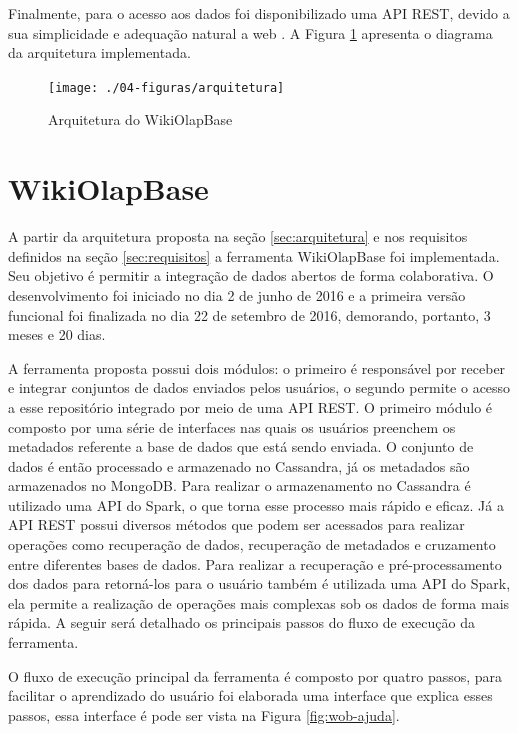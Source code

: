 Finalmente, para o acesso aos dados foi disponibilizado uma API REST, devido a sua 
simplicidade e adequação natural a web \cite{maleshkova2010}. A Figura \ref{fig:arquitetura} apresenta o 
diagrama da arquitetura implementada.  

\begin{figure}[!htb]
    \centering
    \caption{Arquitetura do WikiOlapBase}
    \texttt{[image: ./04-figuras/arquitetura]}
    \label{fig:arquitetura}
\end{figure}

\section{WikiOlapBase}
\label{sec:wob}

A partir da arquitetura proposta na seção \ref{sec:arquitetura} e nos requisitos definidos
na seção \ref{sec:requisitos} a ferramenta WikiOlapBase foi implementada. Seu objetivo é
permitir a integração de dados abertos de forma colaborativa. O desenvolvimento foi iniciado
no dia 2 de junho de 2016 e a primeira versão funcional foi finalizada no dia 22 de setembro
de 2016, demorando, portanto, 3 meses e 20 dias.

A ferramenta proposta possui dois módulos: o primeiro é responsável por receber e integrar
conjuntos de dados enviados pelos usuários, o segundo permite o acesso a esse repositório
integrado por meio de uma API REST. O primeiro módulo é composto por uma série de interfaces
nas quais os usuários preenchem os metadados referente a base de dados que está
sendo enviada. O conjunto de dados é então processado e armazenado no Cassandra, já os
metadados são armazenados no MongoDB. Para realizar o armazenamento no Cassandra é utilizado
uma API do Spark, o que torna esse processo mais rápido e eficaz. Já a API REST possui diversos
métodos que podem ser acessados para realizar operações como recuperação de dados, recuperação
de metadados e cruzamento entre diferentes bases de dados. Para realizar a recuperação e 
pré-processamento dos dados para retorná-los para o usuário também é utilizada uma API do 
Spark, ela permite a realização de operações mais complexas sob os dados de forma mais 
rápida. A seguir será detalhado os principais passos do fluxo de execução da ferramenta.

O fluxo de execução principal da ferramenta é composto por quatro passos, para facilitar o 
aprendizado do usuário foi elaborada uma interface que explica esses passos, essa
interface é pode ser vista na Figura \ref{fig:wob-ajuda}.

